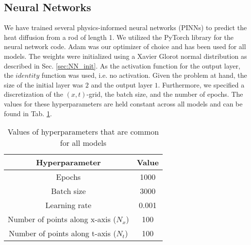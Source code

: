 \subsection{Neural Networks}

We have trained several physics-informed neural networks (PINNs) to predict the heat diffusion from a rod of length 1.
We utilized the PyTorch library \cite{Ansel_PyTorch_2_Faster_2024} for the neural network code. 
Adam was our optimizer of choice and has been used for all models. 
The weights were initialized using a Xavier Glorot normal distribution as described in Sec. \ref{sec:NN_init}. 
As the activation function for the output layer, the $identity$ function was used, i.e. no activation. 
Given the problem at hand, the size of the initial layer was $2$ and the output layer $1$. 
Furthermore, we specified a discretization of the $(x,t)$-grid, the batch size, and the number of epochs. 
The values for these hyperparameters are held constant across all models and can be found in Tab. \ref{tab:valuesfornn}. 

\begin{table}[h!]
    \centering
    \begin{tabular}{|c|c|}
    \hline
        \textbf{Hyperparameter} & \textbf{Value}  \\ \hline
        Epochs & 1000  \\ \hline
        Batch size & 3000 \\\hline
        Learning rate & 0.001 \\ \hline
        Number of points along x-axis ($N_x$) & 100 \\ \hline
        Number of points along t-axis ($N_t$) & 100 \\ \hline
    \end{tabular}
    \caption{Values of hyperparameters that are common for all models}
    \label{tab:valuesfornn}
\end{table}




